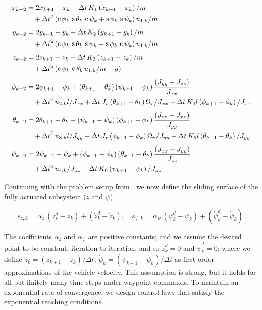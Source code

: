 \documentclass[conf]{new-aiaa}
\DeclareMathOperator{\s}{s}
\DeclareMathOperator{\cs}{c}
\begin{document}
\small
\begin{align}
x_{k+2}
&= 2x_{k+1} - x_k - \Delta t\, K_1 \left(x_{k+1} - x_k\right)/m \notag \\
&\quad + \Delta t^2 \left(\cs\phi_k\,\s\theta_k\,\cs\psi_k + \s\phi_k\,\s\psi_k \right) u_{1,k}/m \\[4pt]
y_{k+2}
&= 2y_{k+1} - y_k - \Delta t\, K_2 \left(y_{k+1} - y_k\right)/m \notag \\
&\quad + \Delta t^2 \left(\cs\phi_k\,\s\theta_k\,\s\psi_k - \s\phi_k\,\cs\psi_k \right) u_{1,k}/m \\[4pt]
z_{k+2}
&= 2z_{k+1} - z_k - \Delta t\, K_3 \left(z_{k+1} - z_k\right)/m \notag \\
&\quad + \Delta t^2 \left(\cs\phi_k\,\cs\theta_k\, u_{1,k}/m - g\right) \\[4pt]
\phi_{k+2}
&= 2\phi_{k+1} - \phi_k + \left(\theta_{k+1} - \theta_k\right)\left(\psi_{k+1} - \psi_k\right) \frac{(J_{yy} - J_{zz})}{J_{xx}} \notag \\
&\quad + \Delta t^2\, u_{2,k} l/J_{xx} + \Delta t\, J_r \left(\theta_{k+1} - \theta_k\right) \Omega_r/J_{xx} - \Delta t\, K_4 l \left(\phi_{k+1} - \phi_k\right)/J_{xx} \\[4pt]
\theta_{k+2}
&= 2\theta_{k+1} - \theta_k + \left(\psi_{k+1} - \psi_k\right)\left(\phi_{k+1} - \phi_k\right) \frac{(J_{zz} - J_{xx})}{J_{yy}} \notag \\
&\quad + \Delta t^2\, u_{3,k} l/J_{yy} - \Delta t\, J_r \left(\phi_{k+1} - \phi_k\right) \Omega_r/J_{yy} - \Delta t\, K_5 l \left(\theta_{k+1} - \theta_k\right)/J_{yy} \\[4pt]
\psi_{k+2}
&= 2\psi_{k+1} - \psi_k + \left(\phi_{k+1} - \phi_k\right)\left(\theta_{k+1} - \theta_k\right) \frac{(J_{xx} - J_{yy})}{J_{zz}} \notag \\
&\quad + \Delta t^2\, u_{4,k}/J_{zz} - \Delta t\, K_6 \left(\psi_{k+1} - \psi_k\right)/J_{zz}
\end{align}
\normalsize

Continuing with the problem setup from \cite{refs:Xiong2016}, we now define the sliding surface of the fully actuated subsystem ($z$ and $\psi$).

\small
\begin{equation}
s_{z,k} = \alpha_z\,(z_k^d - z_k) + (\dot z_k^d - \dot z_k), \quad
s_{\psi,k} = \alpha_\psi\,(\psi_k^d - \psi_k) + (\dot\psi_k^d - \dot\psi_k).
\end{equation}
\normalsize

The coefficients $\alpha_z$ and $\alpha_\psi$ are positive constants; and we assume the desired point to be constant, iteration-to-iteration, and so $\dot z_k^d = 0$ and $\dot\psi_k^d = 0$; where we define $\dot z_k = (z_{k+1} - z_k)/\Delta t$, $\dot\psi_k = \left(\psi_{k+1} - \psi_k\right)/\Delta t$ as first-order approximations of the vehicle velocity. This assumption is strong, but it holds for all but finitely many time steps under waypoint commands. To maintain an exponential rate of convergence, we design control laws that satisfy the exponential reaching conditions.
\end{document}
